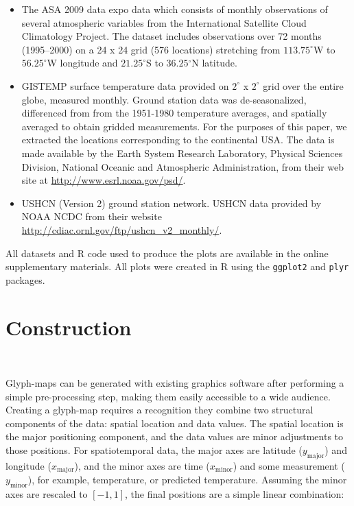 \documentclass[oneside]{article}
\newcommand\amin{\text{minor}}
\newcommand\amaj{\text{major}}
\begin{document}
\begin{itemize}

  \item The ASA 2009 data expo data which consists of monthly observations of
  several atmospheric variables from the International Satellite Cloud
  Climatology Project. The dataset includes observations over 72 months
  (1995--2000) on a 24 x 24 grid (576 locations) stretching from
  $113.75^{\circ}$W to $56.25^{\circ}$W longitude and $21.25^{\circ}$S to
  $36.25{^\circ}$N latitude.

\item GISTEMP surface temperature data provided on $2^{\circ}$ x
  $2^{\circ}$ grid over the entire globe, measured monthly. Ground
  station data was de-seasonalized, differenced from from the
  1951-1980 temperature averages, and spatially averaged to obtain
  gridded measurements. For the purposes of this paper, we extracted
  the locations corresponding to the continental USA. The data is made
  available by the Earth System Research Laboratory, Physical Sciences
  Division, National Oceanic and Atmospheric Administration, from
  their web site at \url{http://www.esrl.noaa.gov/psd/}.

  \item USHCN (Version 2) ground station network. USHCN data provided by NOAA NCDC from their website \url{http://cdiac.ornl.gov/ftp/ushcn_v2_monthly/}.
  
\end{itemize}

All datasets and R code used to produce the plots are available in the online supplementary materials. All plots were created in R \citep{R} using the {\tt ggplot2} \citep{me:ggplot2} and {\tt plyr} \citep{me:plyr} packages. 

\section{Construction}~\label{sec:construction}

Glyph-maps can be generated with existing graphics software after performing a simple pre-processing step, making them easily accessible to a wide audience. Creating a glyph-map requires a recognition they combine two structural components of the data: spatial location and data values. The spatial location is the major positioning component, and the data values are minor adjustments to those positions. For spatiotemporal data, the major axes are latitude ($y_{\amaj}$) and longitude ($x_{\amaj}$), and the minor axes are time ($x_{\amin}$) and some measurement ($y_{\amin}$), for example, temperature, or predicted temperature. Assuming the minor axes are rescaled to $[-1, 1]$, the final positions are a simple linear combination:
\end{document}
